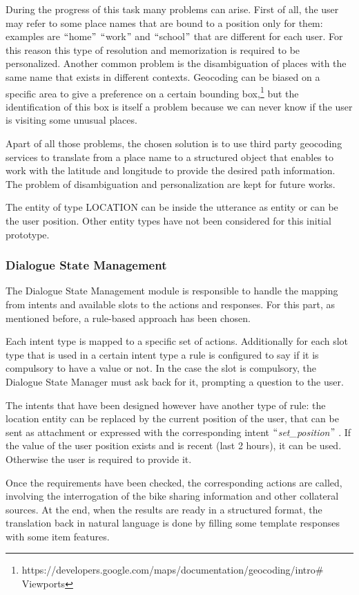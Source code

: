 During the progress of this task many problems can arise. First of all, the user may refer to some place names that are bound to a position only for them: examples are $``$home$"$  $``$work$"$  and $``$school$"$  that are different for each user. For this reason this type of resolution and memorization is required to be personalized. Another common problem is the disambiguation of places with the same name that exists in different contexts. Geocoding can be biased on a specific area to give a preference on a certain bounding box,\footnote{ https://developers.google.com/maps/documentation/geocoding/intro$\#$ Viewports  } but the identification of this box is itself a problem because we can never know if the user is visiting some unusual places.

Apart of all those problems, the chosen solution is to use third party geocoding services to translate from a place name to a structured object that enables to work with the latitude and longitude to provide the desired path information. The problem of disambiguation and personalization are kept for future works.

The entity of type LOCATION can be inside the utterance as entity or can be the user position. Other entity types have not been considered for this initial prototype.

\subsubsection{Dialogue State Management}
The Dialogue State Management module is responsible to handle the mapping from intents and available slots to the actions and responses. For this part, as mentioned before, a rule-based approach has been chosen.

Each intent type is mapped to a specific set of actions. Additionally for each slot type that is used in a certain intent type a rule is configured to say if it is compulsory to have a value or not. In the case the slot is compulsory, the Dialogue State Manager must ask back for it, prompting a question to the user.

The intents that have been designed however have another type of rule: the location entity can be replaced by the current position of the user, that can be sent as attachment or expressed with the corresponding intent $``$\textit{set\_position}$"$ . If the value of the user position exists and is recent (last 2 hours), it can be used. Otherwise the user is required to provide it.

Once the requirements have been checked, the corresponding actions are called, involving the interrogation of the bike sharing information and other collateral sources. At the end, when the results are ready in a structured format, the translation back in natural language is done by filling some template responses with some item features.


